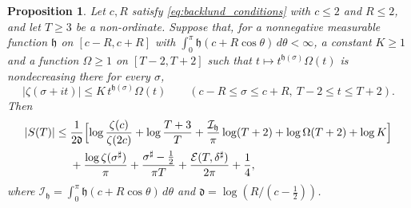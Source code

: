 \documentclass[11pt,a4paper]{article}
\makeatletter
\numberwithin{equation}{section}
\DeclareRobustCommand{\CGeqref}[1]{\eqref{#1}}
\let\CG@origeqref\eqref
\newcommand{\CG@gettip}[1]{\@ifundefined{CGTip@#1}{#1}{\csname CGTip@#1\endcsname}}
\DeclareRobustCommand{\CGeqref}[1]{\pdftooltip{\CG@origeqref{#1}}{\CG@gettip{#1}}}
\newtheorem{proposition}[theorem]{Proposition}
\theoremstyle{definition}
\theoremstyle{remark}
\makeatother
\begin{document}
\begin{proposition}\label{prop:master}
Let $c,R$ satisfy \CGeqref{eq:backlund_conditions} with $c\le2$ and $R\le2$, and let $T\ge3$ be a non-ordinate. Suppose that, for a nonnegative measurable function $\mathfrak h$ on $[c-R,c+R]$ with $\int_0^\pi\mathfrak h(c+R\cos\theta)\,d\theta<\infty$, a constant $K\ge1$ and a function $\Omega\ge1$ on $[T-2,T+2]$ such that $t\mapsto t^{\mathfrak h(\sigma)}\Omega(t)$ is nondecreasing there for every $\sigma$,
\begin{equation}
|\zeta(\sigma+it)|\le K\,t^{\mathfrak h(\sigma)}\Omega(t)\qquad(c-R\le\sigma\le c+R,\ T-2\le t\le T+2).
\label{eq:zeta_hyp}
\end{equation}
Then
\begin{equation}
\begin{split}
|S(T)|\le{}&\frac1{2\mathfrak d}\Bigl[\log\frac{\zeta(c)}{\zeta(2c)}+\log\frac{T+3}T+\frac{\mathcal I_{\mathfrak h}}\pi\log(T+2)+\log\Omega(T+2)+\log K\Bigr]\\
&+\frac{\log\zeta(\sigma^\sharp)}\pi+\frac{\sigma^\sharp-\frac12}{\pi T}+\frac{\mathcal E(T,\delta^\sharp)}{2\pi}+\frac14,
\end{split}
\label{eq:master}
\end{equation}
where $\mathcal I_{\mathfrak h}=\int_0^\pi\mathfrak h(c+R\cos\theta)\,d\theta$ and $\mathfrak d=\log(R/(c-\frac12))$.
\end{proposition}
\end{document}
